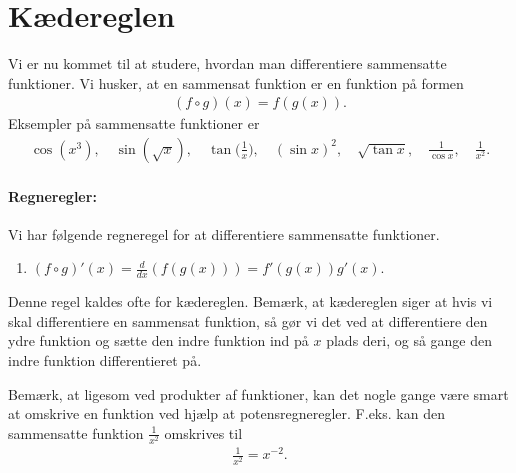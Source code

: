 \section{Kædereglen}
\noindent Vi er nu kommet til at studere, hvordan man differentiere sammensatte funktioner. Vi husker, at en sammensat funktion er en funktion på formen
\begin{align*}
(f \circ g)(x) = f(g(x)).
\end{align*}
Eksempler på sammensatte funktioner er
\begin{align*}
\cos(x^3), \quad \sin(\sqrt{x}), \quad \tan\Big(\frac{1}{x}\Big), \quad (\sin x)^2, \quad \sqrt{\tan x}, \quad \frac{1}{\cos x}, \quad \frac{1}{x^2}.
\end{align*}

\paragraph*{Regneregler:}
Vi har følgende regneregel for at differentiere sammensatte funktioner.
\begin{enumerate}
\item $(f \circ g)'(x) = \frac{d}{dx}(f(g(x))) = f'(g(x))g'(x)$.
\end{enumerate}
Denne regel kaldes ofte for kædereglen. Bemærk, at kædereglen siger at hvis vi skal differentiere en sammensat funktion, så gør vi det ved at differentiere den ydre funktion og sætte den indre funktion ind på $x$ plads deri, og så gange den indre funktion differentieret på.

Bemærk, at ligesom ved produkter af funktioner, kan det nogle gange være smart at omskrive en funktion ved hjælp at potensregneregler. F.eks. kan den sammensatte funktion $ \frac{1}{x^2}$ omskrives til
\begin{align*}
\frac{1}{x^2}=x^{-2}.
\end{align*}
